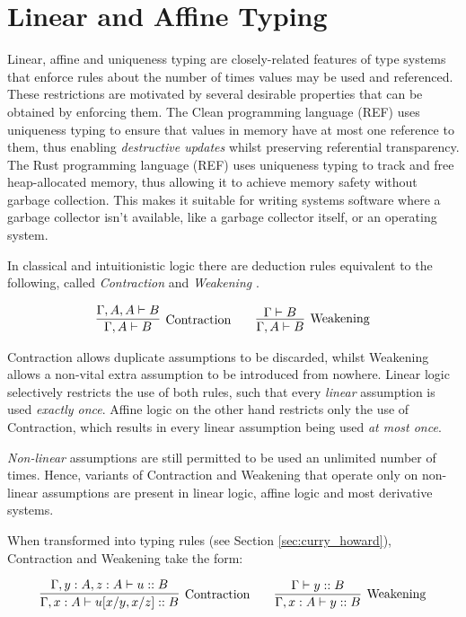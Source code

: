 \documentclass[]{unswthesis}
\begin{document}
\section{Linear and Affine Typing}

Linear, affine and uniqueness typing are closely-related features of type systems that enforce rules about the number of times values may be used and referenced. These restrictions are motivated by several desirable properties that can be obtained by enforcing them. The Clean programming language (REF) uses uniqueness typing to ensure that values in memory have at most one reference to them, thus enabling \textit{destructive updates} whilst preserving referential transparency. The Rust programming language (REF) uses uniqueness typing to track and free heap-allocated memory, thus allowing it to achieve memory safety without garbage collection. This makes it suitable for writing systems software where a garbage collector isn't available, like a garbage collector itself, or an operating system.

In classical and intuitionistic logic there are deduction rules equivalent to the following, called \textit{Contraction} and \textit{Weakening} \cite{wadler90, wadler93}.

\begin{eqnarray*}
\infer[\text{Contraction}]{\Gamma, A \vdash B}{
	\Gamma, A, A \vdash B
}
\qquad
\infer[\text{Weakening}]{\Gamma, A \vdash B}{
    \Gamma \vdash B
}
\end{eqnarray*}

Contraction allows duplicate assumptions to be discarded, whilst Weakening allows a non-vital extra assumption to be introduced from nowhere. Linear logic \cite{girard87} selectively restricts the use of both rules, such that every \textit{linear} assumption is used \textit{exactly once}. Affine logic on the other hand restricts only the use of Contraction, which results in every linear assumption being used \textit{at most once}.

\textit{Non-linear} assumptions are still permitted to be used an unlimited number of times. Hence, variants of Contraction and Weakening that operate only on non-linear assumptions are present in linear logic, affine logic and most derivative systems.

When transformed into typing rules (see Section \ref{sec:curry_howard}), Contraction and Weakening take the form:

\begin{eqnarray*}
\infer[\text{Contraction}]{\Gamma, x : A \vdash u[x/y, x/z] :: B}{
	\Gamma, y : A, z : A \vdash u :: B
}
\qquad
\infer[\text{Weakening}]{\Gamma, x : A \vdash y :: B}{
    \Gamma\vdash y :: B
}
\end{eqnarray*}
\end{document}
